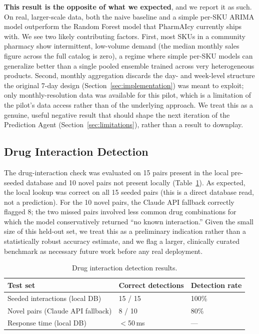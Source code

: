 \documentclass[12pt,a4paper]{article}
\begin{document}
\textbf{This result is the opposite of what we expected}, and we report it as such. On real, larger-scale data, both the naive baseline and a simple per-SKU ARIMA model outperform the Random Forest model that PharmAIcy currently ships with. We see two likely contributing factors. First, most SKUs in a community pharmacy show intermittent, low-volume demand (the median monthly sales figure across the full catalog is zero), a regime where simple per-SKU models can generalize better than a single pooled ensemble trained across very heterogeneous products. Second, monthly aggregation discards the day- and week-level structure the original 7-day design (Section~\ref{sec:implementation}) was meant to exploit; only monthly-resolution data was available for this pilot, which is a limitation of the pilot's data access rather than of the underlying approach. We treat this as a genuine, useful negative result that should shape the next iteration of the Prediction Agent (Section~\ref{sec:limitations}), rather than a result to downplay.

\subsection{Drug Interaction Detection}

The drug-interaction check was evaluated on 15 pairs present in the local pre-seeded database and 10 novel pairs not present locally (Table~\ref{tab:drug}). As expected, the local lookup was correct on all 15 seeded pairs (this is a direct database read, not a prediction). For the 10 novel pairs, the Claude API fallback correctly flagged 8; the two missed pairs involved less common drug combinations for which the model conservatively returned ``no known interaction.'' Given the small size of this held-out set, we treat this as a preliminary indication rather than a statistically robust accuracy estimate, and we flag a larger, clinically curated benchmark as necessary future work before any real deployment.

\begin{table}[H]
\centering
\caption{Drug interaction detection results.}
\label{tab:drug}
\renewcommand{\arraystretch}{1.2}
\begin{tabular}{lll}
\toprule
\textbf{Test set} & \textbf{Correct detections} & \textbf{Detection rate} \\
\midrule
Seeded interactions (local DB) & 15 / 15 & 100\% \\
Novel pairs (Claude API fallback) & 8 / 10 & 80\% \\
Response time (local DB) & $<$50\,ms & --- \\
\bottomrule
\end{tabular}
\end{table}
\end{document}
